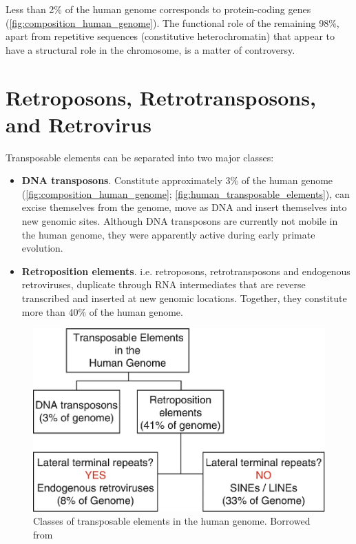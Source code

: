 Less than 2\% of the human genome corresponds to protein-coding genes (\autoref{fig:composition_human_genome}). The functional 
role of the remaining 98\%, apart from repetitive sequences (constitutive heterochromatin) that appear to have a structural 
role in the chromosome, is a matter of controversy. 

\section{Retroposons, Retrotransposons, and Retrovirus}
Transposable elements can be separated into two major classes: 
\begin{itemize}
    \item \textbf{DNA transposons}. Constitute approximately 3\% of the human genome (\autoref{fig:composition_human_genome}; 
    \autoref{fig:human_transposable_elements}), 
    can excise themselves from the genome, move as DNA and insert themselves into new genomic sites. Although DNA transposons 
    are currently not mobile in the human genome, they were apparently active during early primate evolution.
    \item \textbf{Retroposition elements}. i.e. retroposons, retrotransposons and endogenous retroviruses, duplicate through 
    RNA intermediates that are reverse transcribed and inserted at new genomic locations. Together, they constitute more 
    than 40\% of the human genome.
\end{itemize}
\begin{figure}[!ht]
    \centering
    \includegraphics[width=1\linewidth]{./figure/human_transposable_elements.png}
    \caption{Classes of transposable elements in the human genome. Borrowed from  \cite{Pena2021}}
    \label{fig:human_transposable_elements}
\end{figure}

